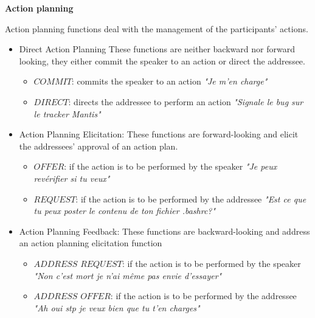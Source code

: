 \textbf{Action planning}
\vspace{0.1cm}

Action planning functions deal with the management of the participants' actions. 

\begin{itemize}
	\item Direct Action Planning
		\newline These functions are neither backward nor forward looking, they either commit the speaker to an action or direct the addressee.
		\begin{itemize}
			\item $COMMIT$: commits the speaker to an action
			\newline \textit{"Je m'en charge"}
			\item $DIRECT$: directs the addressee to perform an action
			\newline \textit{"Signale le bug sur le tracker Mantis"}
		\end{itemize}
	\item Action Planning Elicitation:
		\newline These functions are forward-looking and elicit the addressees' approval of an action plan.
		\begin{itemize}
			\item $OFFER$: if the action is to be performed by the speaker
			\newline \textit{"Je peux revérifier si tu veux"}
			\item $REQUEST$: if the action is to be performed by the addressee
			\newline \textit{"Est ce que tu peux poster le contenu de ton fichier .bashrc?"}
		\end{itemize}
	\item Action Planning Feedback:
		\newline These functions are backward-looking and address an action planning elicitation function
		\begin{itemize}
			\item $ADDRESS$ $REQUEST$: if the action is to be performed by the speaker
			\newline \textit{"Non c'est mort je n'ai même pas envie d'essayer"}
			\item $ADDRESS$ $OFFER$: if the action is to be performed by the addressee
			\newline \textit{"Ah oui stp je veux bien que tu t'en charges"}
		\end{itemize}
\end{itemize}


